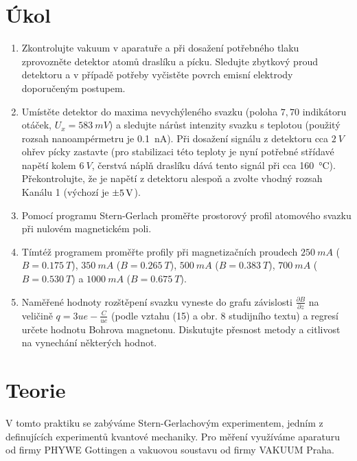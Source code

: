 \documentclass{scirep}
\begin{document}
    \section*{Úkol}

    \begin{enumerate}

        \item Zkontrolujte vakuum v aparatuře a při dosažení potřebného tlaku zprovozněte detektor atomů draslíku a pícku.
        Sledujte zbytkový proud detektoru a v případě potřeby vyčistěte povrch emisní elektrody doporučeným postupem.
        \item Umístěte detektor do maxima nevychýleného svazku (poloha $\si{7,70}$ indikátoru otáček, $U_x=\SI{583}{mV}$) a sledujte nárůst intenzity svazku s teplotou (použitý rozsah nanoampérmetru je \SI{0,1}{nA}).
        Při dosažení signálu z detektoru cca $\SI{2}{V}$ ohřev pícky zastavte (pro stabilizaci této teploty je nyní potřebné střídavé napětí kolem $\SI{6}{V}$, čerstvá náplň draslíku dává tento signál při cca \SI{160}{\celsius}).
        Překontrolujte, že je napětí z detektoru alespoň a zvolte vhodný rozsah Kanálu 1 (výchozí je $\SI{\pm 5}{V}$).
        \item Pomocí programu Stern-Gerlach proměřte prostorový profil atomového svazku při nulovém magnetickém poli.
        \item Tímtéž programem proměřte profily při magnetizačních proudech $\SI{250}{mA}$ ($B=\SI{0,175}{T}$), $\SI{350}{mA}$ ($B=\SI{0,265}{T}$), $\SI{500}{mA}$ ($B=\SI{0,383}{T}$), $\SI{700}{mA}$ ($B=\SI{0,530}{T}$) a $\SI{1000}{mA}$ ($B=\SI{0,675}{T}$).
        \item Naměřené hodnoty rozštěpení svazku vyneste do grafu závislosti $\frac{\partial B}{\partial z}$ na veličině $q = 3ue - \frac{C}{ue}$ (podle vztahu (15) a obr. 8 studijního textu) a regresí určete hodnotu Bohrova magnetonu.
        Diskutujte přesnost metody a citlivost na vynechání některých hodnot.

    \end{enumerate}

    \section*{Teorie}

    V tomto praktiku se zabýváme Stern-Gerlachovým experimentem, jedním z definujících experimentů kvantové mechaniky.
    Pro měření využíváme aparaturu od firmy PHYWE Gottingen a vakuovou soustavu od firmy VAKUUM Praha.
\end{document}
